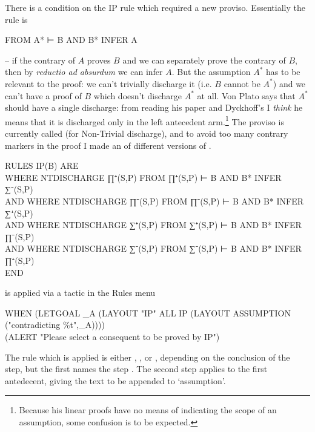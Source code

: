 There is a condition on the IP rule which required a new proviso. Essentially the rule is
\begin{japeish}
FROM A* ⊢ B AND B* INFER A
\end{japeish}
-- if the contrary of $A$ proves $B$ and we can separately prove the contrary of $B$, then by \emph{reductio ad absurdum} we can infer $A$. But the assumption $A^{*}$ has to be relevant to the proof: we can't trivially discharge it (i.e. $B$ cannot be $A^{*}$) and we can't have a proof of $B$ which doesn't discharge $A^{*}$ at all. Von Plato says that $A^{*}$ should have a single discharge: from reading his paper and Dyckhoff's I \emph{think} he means that it is discharged only in the left antecedent arm.\footnote{Because his linear proofs have no means of indicating the scope of an assumption, some confusion is to be expected.} The proviso is currently called  (for Non-Trivial discharge), and to avoid too many contrary markers in the proof I made an  of different versions of .
\begin{japeish}
RULES IP(B) ARE \\
\tab\tab WHERE NTDISCHARGE ∏⁺(S,P) FROM ∏⁺(S,P) ⊢ B AND B* INFER ∑⁻(S,P) \\ 
 AND WHERE NTDISCHARGE ∏⁻(S,P) FROM ∏⁻(S,P) ⊢ B AND B* INFER ∑⁺(S,P)  \\
 AND WHERE NTDISCHARGE ∑⁺(S,P) FROM ∑⁺(S,P) ⊢ B AND B* INFER ∏⁻(S,P)  \\
 AND WHERE NTDISCHARGE ∑⁻(S,P) FROM ∑⁻(S,P) ⊢ B AND B* INFER ∏⁺(S,P) \\
END
\end{japeish}
 is applied via a tactic in the Rules menu
\begin{japeish}
WHEN (LETGOAL \_A (LAYOUT "IP" ALL IP (LAYOUT ASSUMPTION ("contradicting \%t",\_A)))) \\
\tab\tab\tab                  (ALERT "Please select a consequent to be proved by IP") \\
\end{japeish}
The rule which is applied is either , ,  or , depending on the conclusion of the step, but the first  names the step . The second step applies  to the first antedecent, giving the text to be appended to `assumption'.

